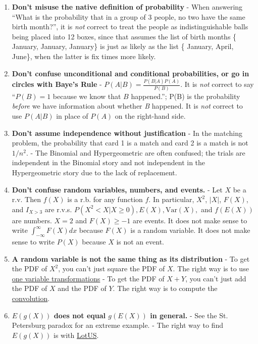 \documentclass[10pt,landscape]{article}
\theoremstyle{definition}
\newcommand{\var}{\textrm{Var}}
\begin{document}
\begin{multicols}{3}
\begin{enumerate} \itemsep -.25em
\item \textbf{Don't misuse the native definition of probability}  - When answering ``What is the probability that in a group of 3 people, no two have the same birth month?'', it is \emph{not} correct to treat the people as indistinguishable balls being placed into 12 boxes, since that assumes the list of birth months \{ January, January, January\} is just as likely as the list \{ January, April, June\}, when the latter is fix times more likely.
\item \textbf{Don't confuse unconditional and conditional probabilities, or go in circles with Baye's Rule} - $P(A|B) = \frac{P(B|A)P(A)}{P(B)}$. It is \emph{not} correct to say ``$P(B) = 1$ because we know that $B$ happened.''; P(B) is the probability \emph{before} we have information about whether \emph{B} happened. It is \emph{not} correct to use $P(A|B)$ in place of $P(A)$ on the right-hand side.
\item \textbf{Don't assume independence without justification} - In the matching problem, the probability that card 1 is a match and card 2 is a match is not $1/n^2$. - The Binomial and Hypergeometric are often confused; the trials are independent in the Binomial story and not independent in the Hypergeometric story due to the lack of replacement.
\item \textbf{Don't confuse random variables, numbers, and events.} - Let $X$ be a r.v. Then $f(X)$ is a r.b. for any function $f$. In particular, $X^2$, $|X|$, $F(X)$, and $I_{X>3}$ are r.v.s. $P(X^2 < X | X \geq 0), E(X), \var(X), $ and $f(E(X))$ are numbers. $X = 2$ and $F(X) \geq -1$ are events. It does not make sense to write $\int_{-\infty}^\infty F(X) dx$ because $F(X)$ is a random variable. It does not make sense to write $P(X)$ because $X$ is not an event.
\item \textbf{A random variable is not the same thing as its distribution} - To get the PDF of $X^2$, you can't just square the PDF of $X$. The right way is to use \hyperref[one variable transformations]{one variable transformations} - To get the PDF of $X + Y$, you can't just add the PDF of $X$ and the PDF of $Y$. The right way is to compute the \hyperref[convolutions]{convolution}.
\item \textbf{$E(g(X))$ does not equal $g(E(X))$ in general.} - See the St. Petersburg paradox for an extreme example. - The right way to find $E(g(X))$ is with \hyperref[lotus]{LotUS}.
\end{enumerate}


\end{multicols}
\end{document}
